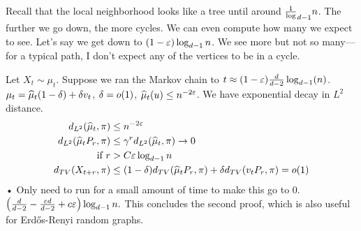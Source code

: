 Recall that the local neighborhood looks like a tree until around $\frac{1}{\log}_{d-1}n$. The further we go down, the more cycles. We can even compute how many we expect to see. Let's say we get down to $(1-\varepsilon)\log_{d-1}n$. We see more but not so many---for a typical path, I don't expect any of the vertices to be in a cycle.


Let $X_t\sim \mu_t$.
Suppose we ran the Markov chain to $t\approx (1-\varepsilon)\frac{d}{d-2}\log_{d-1}(n)$. 
$\mu_t = \widehat{\mu}_t (1-\delta) + \delta v_t$, $\delta=o(1)$, $\widehat{\mu}_t(u)\le n^{-2\varepsilon}$. 
We have exponential decay in $L^2$ distance.
\begin{align}
d_{L^2}(\widehat{\mu}_t, \pi)&\le n^{-2\varepsilon}\\
d_{L^2}(\widehat{\mu}_{t}P_r, \pi) &\le \gamma^rd_{L^2}(\widehat{\mu}_t, \pi)\to 0\\
\text{if }r &> C\varepsilon \log_{d-1}n\\
d_{TV}(X_{t+r}, \pi) &\le (1-\delta) d_{TV}(\widehat{\mu}_tP_r, \pi) + \delta d_{TV}(v_tP_r, \pi)=o(1)
\end{align}•
Only need to run for a small amount of time to 
make this go to 0.
$\left( {\frac{d}{d-2} - \frac{\varepsilon d}{d-2} + c\varepsilon} \right) \log_{d-1}n. $
This concludes the second proof, which is also useful for Erd\H os-Renyi random graphs.
